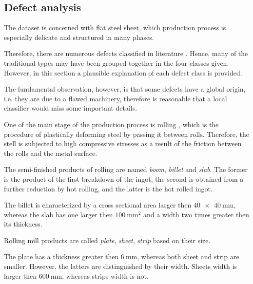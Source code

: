     \subsection{Defect analysis}\label{subsection:defects}
        \par{
            The dataset is concerned with flat steel sheet, which production process is especially delicate and structured in many phases.
        }
        \par{
            Therefore, there are numerous defects classified in literature \cite{defects:64common,defects:mainlinemetals}. Hence, many of the traditional types may have been grouped together in the four classes given. However, in this section a plausible explanation of each defect class is provided.
        }
        \par{
            The fundamental observation, however, is that some defects have a global origin, i.e. they are due to a flawed machinery, therefore is reasonable that a local classifier would miss some important details.
        }
        \par{
            One of the main stage of the production process is rolling \cite{wiki:rolling, defects:rolling}, which is the procedure of plastically deforming steel by passing it between rolls. Therefore, the stell is subjected to high compressive stresses as a result of the friction between the rolls and the metal surface.
        }
        \par{
            The semi-finished products of rolling are named \emph{boom}, \emph{billet} and \emph{slab}. The former is the product of the first breakdown of the ingot, the second is obtained from a further reduction by hot rolling, and the latter is the hot rolled ingot.
        }
        \par{
            The billet is characterized by a cross sectional area larger then $\SI[product-units=power]{40 x 40 }{\mm}$, whereas the slab has one larger then $\SI{100}{\mm\squared}$ and a width two times greater then its thickness.
        }
        \par{
            Rolling mill products are called \emph{plate}, \emph{sheet}, \emph{strip} based on their size.
        }
        \par{
            The plate has a thickness greater then $\SI{6}{\mm}$, whereas both sheet and strip are smaller. However, the latters are distinguished by their width. Sheets width is larger then $\SI{600}{\mm}$, whereas strips width is not.
        }
